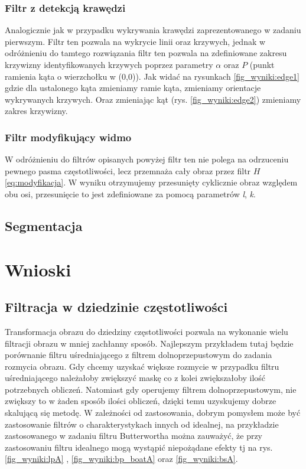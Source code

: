 \documentclass{classrep}
\begin{document}
\subsubsection{Filtr z detekcją krawędzi}

Analogicznie jak w przypadku wykrywania krawędzi zaprezentowanego w zadaniu pierwszym. Filtr ten pozwala na wykrycie linii oraz krzywych, jednak w odróżnieniu do tamtego rozwiązania filtr ten pozwala na zdefiniowane zakresu krzywizny identyfikowanych krzywych poprzez parametry $\alpha$ oraz $P$ (punkt ramienia kąta o wierzchołku w (0,0)). Jak widać na rysunkach \ref{fig_wyniki:edge1} gdzie dla ustalonego kąta zmieniamy ramie kąta, zmieniamy orientacje wykrywanych krzywych. Oraz zmieniając kąt (rys. \ref{fig_wyniki:edge2}) zmieniamy zakres krzywizny.

\subsubsection{Filtr modyfikujący widmo}

W odróżnieniu do filtrów opisanych powyżej filtr ten nie polega na odrzuceniu pewnego pasma częstotliwości, lecz przemnaża cały obraz przez filtr $H$ \ref{eq:modyfikacja}. W wyniku otrzymujemy przesunięty cyklicznie obraz względem obu osi, przesunięcie to jest zdefiniowane za pomocą parametrów \emph{l}, \emph{k}.



\subsection{Segmentacja}




\section{Wnioski}

\subsection{Filtracja w dziedzinie częstotliwości}

Transformacja obrazu do dziedziny częstotliwości pozwala na wykonanie wielu filtracji obrazu w mniej zachłanny sposób. Najlepszym przykładem tutaj będzie porównanie filtru uśredniającego z filtrem dolnoprzepustowym do zadania rozmycia obrazu. Gdy chcemy uzyskać większe rozmycie w przypadku filtru uśredniającego należałoby zwiększyć maskę co z kolei zwiększałoby ilość potrzebnych obliczeń. Natomiast gdy operujemy filtrem dolnoprzepustowym, nie zwiększy to w żaden sposób ilości obliczeń, dzięki temu uzyskujemy dobrze skalującą się metodę. W zależności od zastosowania, dobrym pomysłem może być zastosowanie filtrów o charakterystykach innych od idealnej, na przykładzie zastosowanego w zadaniu filtru Butterwortha można zauważyć, że przy zastosowaniu filtru idealnego mogą wystąpić niepożądane efekty tj na rys. \ref{fig_wyniki:lpA} , \ref{fig_wyniki:bp_boatA} oraz \ref{fig_wyniki:bsA}. 
\end{document}
